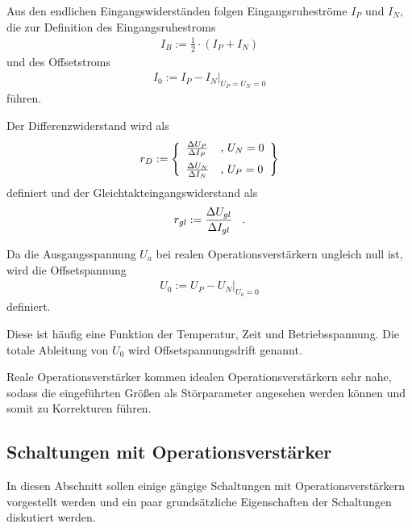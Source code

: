 \documentclass[]{scrartcl}
\begin{document}
Aus den endlichen Eingangswiderständen folgen Eingangsruheströme $I_{P}$ und $I_{N}$, die zur Definition des Eingangsruhestroms
\begin{align}
 I_{B}:=\frac{1}{2} \cdot \left(I_{P}+I_{N}\right)
\end{align}
und des Offsetstroms
\begin{align}
 I_{0}:= \left. I_{P}-I_{N}\right|_{U_{P}=U_{N}=0} 
\end{align}
führen.

Der Differenzwiderstand wird als
\begin{align}
 r_{D}:=\left\lbrace 
\begin{array}{ll}
\frac{\Delta U_{P}}{\Delta I_{P}} & \text{, }U_{N}=0 \vspace{0.2cm}\\
\frac{\Delta U_{N}}{\Delta I_{N}} & \text{, }U_{P}=0
\end{array}
\right\rbrace 
\end{align}
definiert und der Gleichtakteingangswiderstand als
\begin{align}
 r_{gl}:=\frac{\Delta U_{gl}}{\Delta I_{gl}} \hspace{0.3cm}\text{.}
\end{align}

Da die Ausgangsspannung $U_{a}$ bei realen Operationsverstärkern ungleich null ist, wird die Offsetspannung
\begin{align}
 U_0:=\left. U_{P}-U_{N} \right|_{U_{a}=0}
\end{align}
definiert.

Diese ist häufig eine Funktion der Temperatur, Zeit und Betriebsspannung. Die totale Ableitung von $U_{0}$ wird Offsetspannungsdrift genannt.

Reale Operationsverstärker kommen idealen Operationsverstärkern sehr nahe, sodass die eingeführten Größen als Störparameter angesehen werden können und somit zu Korrekturen führen.

\subsection{Schaltungen mit Operationsverstärker}
In diesen Abschnitt sollen einige gängige Schaltungen mit Operationsverstärkern vorgestellt werden und ein paar grundsätzliche Eigenschaften der Schaltungen diskutiert werden.
\end{document}
